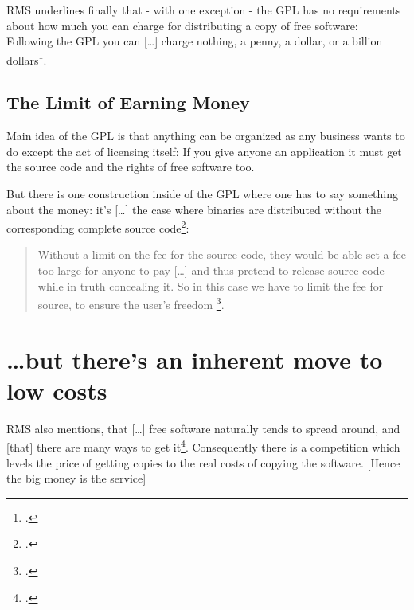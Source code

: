 \documentclass[DIV=calc,BCOR=5mm,11pt,headings=small,oneside,abstract=true, toc=bib]{scrartcl}
\begin{document}
RMS underlines finally that - with one exception - the GPL has no requirements
about how much you can charge for distributing a copy of free software: Following the GPL
you can \glqq{}[\ldots] charge nothing, a penny, a dollar, or a billion
dollars\grqq{}\footcite[cf][64]{Stallman1996b}.

\subsection{The Limit of Earning Money}

Main idea of the GPL is that anything can be organized as any business wants to
do except the act of licensing itself: If you give anyone an application it must
get the source code and the rights of free software too.

But there is one construction inside of the GPL where one has to say something
about the money: it's \glqq{}[\ldots] the case where binaries are
distributed without the corresponding complete source
code\grqq{}\footcite[cf][65]{Stallman1996b}: 

\begin{quote}
\glqq{}Without a limit on the fee for the source code, they would be able set a
fee too large for anyone to pay [\ldots] and thus pretend to release source code
while in truth concealing it. So in this case we have to limit the fee for
source, to ensure the user's freedom
\grqq{}\footcite[][65]{Stallman1996b}.
\end{quote}


\section{\ldots but there's an inherent move to low costs}

RMS also mentions, that \glqq{}[\ldots] free software naturally tends to
spread around, and [that] there are many ways to get
it\grqq{}\footcite[cf][63]{Stallman1996b}. Consequently there is a competition
which levels the price of getting copies to the real costs of copying the
software. [Hence the big money is the service]



\small

\end{document}
